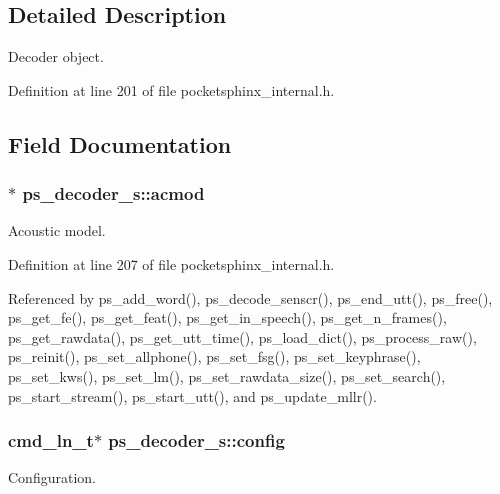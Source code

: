 \subsection{Detailed Description}
Decoder object. 

Definition at line 201 of file pocketsphinx\-\_\-internal.\-h.



\subsection{Field Documentation}
\subsubsection[{acmod}]{$\ast$ ps\-\_\-decoder\-\_\-s\-::acmod}\label{structps__decoder__s_af834d2bc1d44c1d9ef607b025413a0b8}


Acoustic model. 



Definition at line 207 of file pocketsphinx\-\_\-internal.\-h.



Referenced by ps\-\_\-add\-\_\-word(), ps\-\_\-decode\-\_\-senscr(), ps\-\_\-end\-\_\-utt(), ps\-\_\-free(), ps\-\_\-get\-\_\-fe(), ps\-\_\-get\-\_\-feat(), ps\-\_\-get\-\_\-in\-\_\-speech(), ps\-\_\-get\-\_\-n\-\_\-frames(), ps\-\_\-get\-\_\-rawdata(), ps\-\_\-get\-\_\-utt\-\_\-time(), ps\-\_\-load\-\_\-dict(), ps\-\_\-process\-\_\-raw(), ps\-\_\-reinit(), ps\-\_\-set\-\_\-allphone(), ps\-\_\-set\-\_\-fsg(), ps\-\_\-set\-\_\-keyphrase(), ps\-\_\-set\-\_\-kws(), ps\-\_\-set\-\_\-lm(), ps\-\_\-set\-\_\-rawdata\-\_\-size(), ps\-\_\-set\-\_\-search(), ps\-\_\-start\-\_\-stream(), ps\-\_\-start\-\_\-utt(), and ps\-\_\-update\-\_\-mllr().

\subsubsection[{config}]{\setlength{\rightskip}{0pt plus 5cm}cmd\-\_\-ln\-\_\-t$\ast$ ps\-\_\-decoder\-\_\-s\-::config}\label{structps__decoder__s_a0565ed97b32408bd05c8104f020cef05}


Configuration. 



